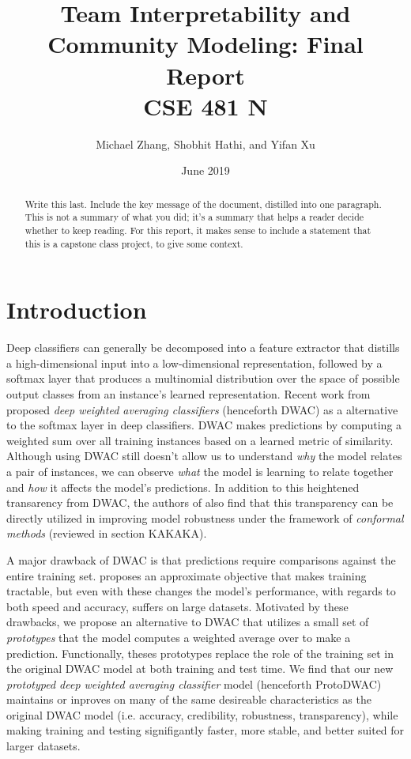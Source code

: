 \documentclass[11pt,letterpaper]{article}
\title{Team Interpretability and Community Modeling:  Final Report \\ CSE 481 N}
\author{Michael Zhang, Shobhit Hathi, and Yifan Xu}
\date{June 2019}
\begin{document}
\maketitle

\begin{abstract}
Write this last.  Include the key message of the document, distilled into one paragraph.  This is not a summary of what you did; it’s a summary that helps a reader decide whether to keep reading.  For this report, it makes sense to include a statement that this is a capstone class project, to give some context.
\end{abstract}

\section{Introduction}
Deep classifiers can generally be decomposed into a feature extractor that distills a high-dimensional input into a low-dimensional representation, followed by a softmax layer that produces a multinomial distribution over the space of possible output classes from an instance's learned representation. Recent work from \citet{card.2019} proposed \textit{deep weighted averaging classifiers} (henceforth DWAC) as a alternative to the softmax layer in deep classifiers. DWAC makes predictions by computing a weighted sum over all training instances based on a learned metric of similarity. Although using DWAC still doesn't allow us to understand \textit{why} the model relates a pair of instances, we can observe \textit{what} the model is learning to relate together and \textit{how} it affects the model's predictions. In addition to this heightened transarency from DWAC, the authors of \citet{card.2019} also find that this transparency can be directly utilized in improving model robustness under the framework of \textit{conformal methods} (reviewed in section KAKAKA).

A major drawback of DWAC is that predictions require comparisons against the entire training set. \citet{card.2019} proposes an approximate objective that makes training tractable, but even with these changes the model's performance, with regards to both speed and accuracy, suffers on large datasets. Motivated by these drawbacks, we propose an alternative to DWAC that utilizes a small set of \textit{prototypes} that the model computes a weighted average over to make a prediction. Functionally, theses prototypes replace the role of the training set in the original DWAC model at both training and test time. We find that our new \textit{prototyped deep weighted averaging classifier} model (henceforth ProtoDWAC) maintains or inproves on many of the same desireable characteristics as the original DWAC model (i.e. accuracy, credibility, robustness, transparency), while making training and testing signifigantly faster, more stable, and better suited for larger datasets.
\end{document}
